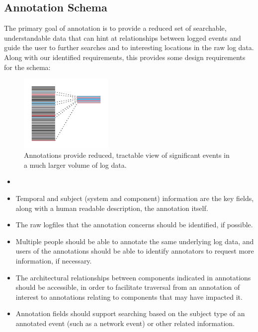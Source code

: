 \subsection{Annotation Schema}

The primary goal of annotation is to provide a reduced set of searchable,
understandable data that can hint at relationships between logged 
events and guide the user to further searches and to interesting locations
in the raw log data. Along with our identified requirements, this 
provides some design requirements for the schema:

\begin{figure}
\includegraphics[width=0.4\textwidth]{annotations.png}
\caption{Annotations provide reduced, tractable view of significant events
in a much larger volume of log data.}
\label{f:annotations}
\end{figure}

\begin{itemize}
\item 
\item Temporal and subject (system and component) information are 
      the key fields, along with a human readable description, the 
      annotation itself.
\item The raw logfiles that the annotation concerns should be identified,
      if possible.
\item Multiple people should be able to annotate the same underlying 
      log data, and users of the annotations should be able to 
      identify annotators to request more information, if necessary.  
\item The architectural relationships between components indicated in 
      annotations should be accessible, in order to facilitate 
      traversal from an annotation of interest to annotations relating to
      components that may have impacted it.
\item Annotation fields should support searching based on the subject type 
      of an annotated event (such as a network event) or other 
      related information.
\end{itemize}

